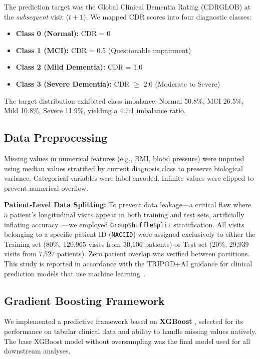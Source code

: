 \documentclass[preprint,12pt]{elsarticle}
\begin{document}
The prediction target was the Global Clinical Dementia Rating (CDRGLOB) at the \textit{subsequent} visit ($t+1$). We mapped CDR scores into four diagnostic classes:
\begin{itemize}
    \item \textbf{Class 0 (Normal):} CDR = 0
    \item \textbf{Class 1 (MCI):} CDR = 0.5 (Questionable impairment)
    \item \textbf{Class 2 (Mild Dementia):} CDR = 1.0
    \item \textbf{Class 3 (Severe Dementia):} CDR $\geq$ 2.0 (Moderate to Severe)
\end{itemize}

The target distribution exhibited class imbalance: Normal 50.8\%, MCI 26.5\%, Mild 10.8\%, Severe 11.9\%, yielding a 4.7:1 imbalance ratio.

\subsection{Data Preprocessing}

Missing values in numerical features (e.g., BMI, blood pressure) were imputed using median values stratified by current diagnosis class to preserve biological variance. Categorical variables were label-encoded. Infinite values were clipped to prevent numerical overflow.

\textbf{Patient-Level Data Splitting:} To prevent data leakage---a critical flaw where a patient's longitudinal visits appear in both training and test sets, artificially inflating accuracy~\cite{kapoor2023}---we employed \texttt{GroupShuffleSplit} stratification. All visits belonging to a specific patient ID (\texttt{NACCID}) were assigned exclusively to either the Training set (80\%, 120,965 visits from 30,106 patients) or Test set (20\%, 29,939 visits from 7,527 patients). Zero patient overlap was verified between partitions. This study is reported in accordance with the TRIPOD+AI guidance for clinical prediction models that use machine learning~\cite{collins2024,collins2021}.

\subsection{Gradient Boosting Framework}

We implemented a predictive framework based on \textbf{XGBoost} \cite{chen2016}, selected for its performance on tabular clinical data and ability to handle missing values natively. The base XGBoost model without oversampling was the final model used for all downstream analyses.
\end{document}
